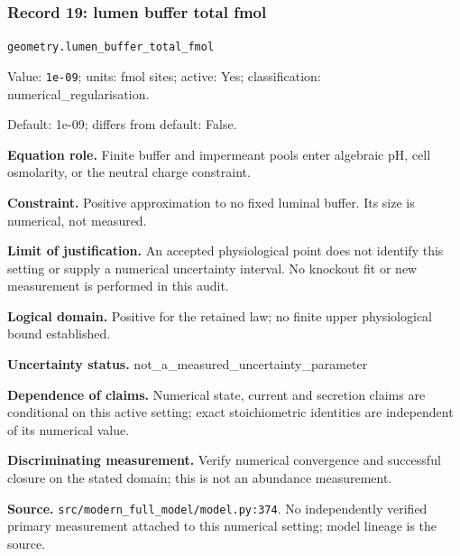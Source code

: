 \subsubsection*{Record 19: lumen buffer total fmol}
{\small \nolinkurl{geometry.lumen_buffer_total_fmol}\par

Value: \texttt{1e-09}; units: fmol sites; active: Yes; classification: numerical\_regularisation.\par

Default: 1e-09; differs from default: False.\par

\textbf{Equation role.} Finite buffer and impermeant pools enter algebraic pH, cell osmolarity, or the neutral charge constraint.\par

\textbf{Constraint.} Positive approximation to no fixed luminal buffer. Its size is numerical, not measured.\par

\textbf{Limit of justification.} An accepted physiological point does not identify this setting or supply a numerical uncertainty interval. No knockout fit or new measurement is performed in this audit.\par

\textbf{Logical domain.} Positive for the retained law; no finite upper physiological bound established.\par

\textbf{Uncertainty status.} not\_a\_measured\_uncertainty\_parameter\par

\textbf{Dependence of claims.} Numerical state, current and secretion claims are conditional on this active setting; exact stoichiometric identities are independent of its numerical value.\par

\textbf{Discriminating measurement.} Verify numerical convergence and successful closure on the stated domain; this is not an abundance measurement.\par

\textbf{Source.} \nolinkurl{src/modern_full_model/model.py:374}. No independently verified primary measurement attached to this numerical setting; model lineage is the source.\par}

